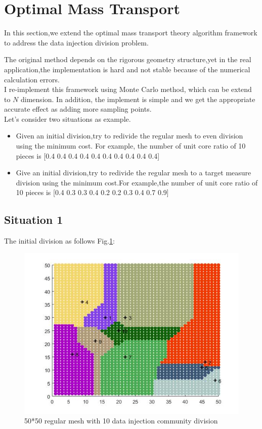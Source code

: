 \section{Optimal Mass Transport}

In this section,we extend the optimal mass transport theory algorithm framework \cite{gu2013variational} \cite{su2017volume} to address the data injection division problem. 

\vspace*{20pt}

The original method depends on the rigorous geometry structure,yet in the real application,the implementation is hard and not stable because of the numerical calculation errors. \\

I re-implement this framework using Monte Carlo method, which can be extend to $N$ dimension. In addition, the implement is simple and we get the appropriate accurate effect as adding more sampling points.
\\

Let's consider two situations as example.
\begin{itemize}
\item Given an initial division,try to redivide the regular mesh to even division using the minimum cost. For example, the number of unit core ratio of 10 pieces is [0.4 0.4 0.4 0.4 0.4 0.4 0.4 0.4 0.4 0.4]
\item Give an initial division,try to redivide the regular mesh to a target measure division using the minimum cost.For example,the number of unit core ratio of 10 pieces is [0.4 0.3 0.3 0.4 0.2 0.2 0.3 0.4 0.7 0.9]
\end{itemize}



\subsection{Situation 1}

The initial division as follows Fig.\ref{voronoiinit}:

\begin{figure}[h]
\centering\includegraphics[width=0.8\linewidth]{figure/voronoiinit}
\caption{50*50 regular mesh with 10 data injection community division}
\label{voronoiinit}
\end{figure}

